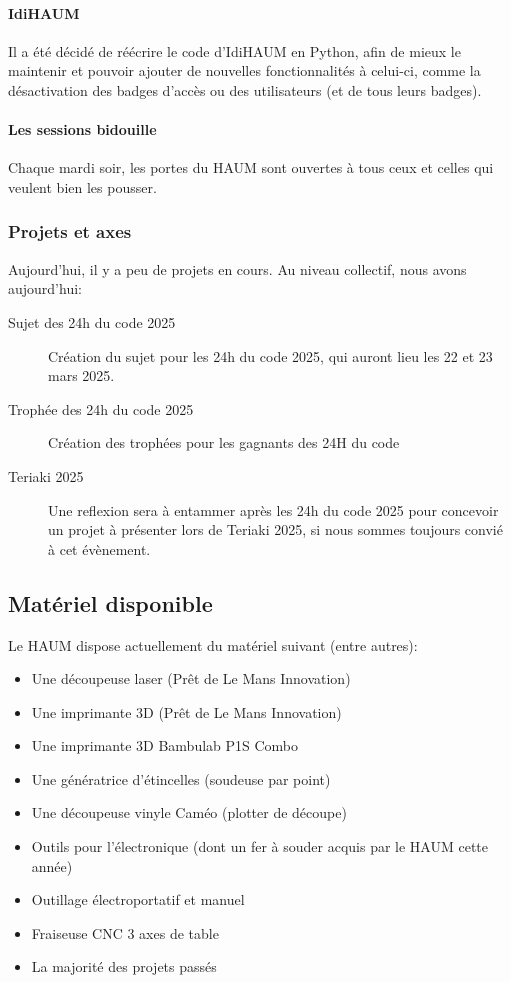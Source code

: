 \documentclass[a4paper, 11pt]{article}
\begin{document}
\begin{appendices}
\paragraph{IdiHAUM} Il a été décidé de réécrire le code d'IdiHAUM en Python, afin de 
mieux le maintenir et pouvoir ajouter de nouvelles fonctionnalités à celui-ci, comme la 
désactivation des badges d'accès ou des utilisateurs (et de tous leurs badges).

\paragraph{Les sessions bidouille} Chaque mardi soir, les portes du HAUM sont ouvertes 
à tous ceux et celles qui veulent bien les pousser.

\subsubsection{Projets et axes}

Aujourd'hui, il y a peu de projets en cours. Au niveau collectif, nous avons aujourd'hui:
\bigskip
\begin{description}
    \item[Sujet des 24h du code 2025] Création du sujet pour les 24h du code 2025, qui auront lieu les 22 et 23 mars 2025. 
    \item[Trophée des 24h du code 2025] Création des trophées pour les gagnants des 24H du code
    \item[Teriaki 2025] Une reflexion sera à entammer après les 24h du code 2025 pour concevoir un projet à présenter lors de Teriaki 2025, si nous sommes toujours convié à cet évènement. 
\end{description}

\subsection{Matériel disponible}

Le HAUM dispose actuellement du matériel suivant (entre autres):

\begin{itemize}
    \item Une découpeuse laser (Prêt de Le Mans Innovation)
    \item Une imprimante 3D (Prêt de Le Mans Innovation)
    \item Une imprimante 3D Bambulab P1S Combo
    \item Une génératrice d'étincelles (soudeuse par point)
    \item Une découpeuse vinyle Caméo (plotter de découpe)
    \item Outils pour l'électronique (dont un fer à souder acquis par le HAUM cette année)
    \item Outillage électroportatif et manuel
    \item Fraiseuse CNC 3 axes de table
    \item La majorité des projets passés
\end{itemize}


\end{appendices}
\end{document}
